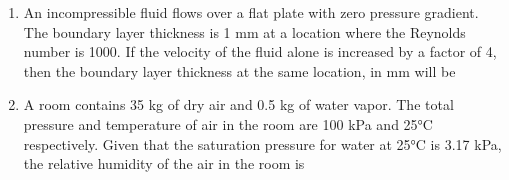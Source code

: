\documentclass[journal,11pt,onecolumn]{IEEEtran}
\begin{document}
\begin{enumerate}[resume]
          \begin{enumerate}
          \end{enumerate}

    \item An incompressible fluid flows over a flat plate with zero pressure gradient. The boundary layer thickness is 1 mm at a location where the Reynolds number is 1000. If the velocity of the fluid alone is increased by a factor of 4, then the boundary layer thickness at the same location, in mm will be

          \begin{enumerate}
          \end{enumerate}

    \item A room contains 35 kg of dry air and 0.5 kg of water vapor. The total pressure and temperature of air in the room are 100 kPa and 25°C respectively. Given that the saturation pressure for water at 25°C is 3.17 kPa, the relative humidity of the air in the room is

          \begin{enumerate}
          \end{enumerate}


\end{enumerate}
\end{document}
